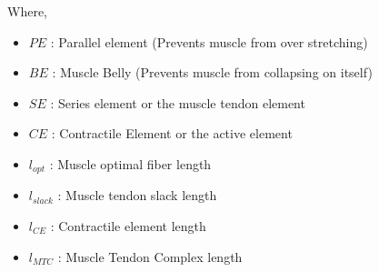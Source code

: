 \documentclass{cmc}
\begin{document}
Where,

\begin{itemize}
\item $PE$ : Parallel element (Prevents muscle from over stretching)
\item $BE$ : Muscle Belly (Prevents muscle from collapsing on itself)
\item $SE$ : Series element or the muscle tendon element
\item $CE$ : Contractile Element or the active element
\item $l_{opt}$ : Muscle optimal fiber length
\item $l_{slack}$ : Muscle tendon slack length
\item $l_{CE}$ : Contractile element length
\item $l_{MTC}$ : Muscle Tendon Complex length
\end{itemize}
\end{document}
